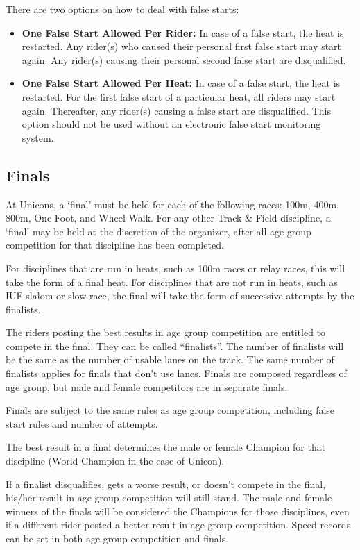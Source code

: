 There are two options on how to deal with false starts:
\begin{itemize}
\item \textbf{One False Start Allowed Per Rider:}
In case of a false start, the heat is restarted.
Any rider(s) who caused their personal first false start may start again.
Any rider(s) causing their personal second false start are disqualified.
\item \textbf{One False Start Allowed Per Heat:} 
In case of a false start, the heat is restarted.
For the first false start of a particular heat, all riders may start again.
Thereafter, any rider(s) causing a false start are disqualified.
This option should not be used without an electronic false start monitoring system.
\end{itemize}


\subsection{Finals}

At Unicons, a `final' must be held for each of the following races: 100m, 400m, 800m, One Foot, and Wheel Walk. 
For any other Track \& Field discipline, a `final' may be held at the discretion of the organizer, after all age group competition for that discipline has been completed.

For disciplines that are run in heats, such as 100m races or relay races, this will take the form of a final heat. 
For disciplines that are not run in heats, such as IUF slalom or slow race, the final will take the form of successive attempts by the finalists.

The riders posting the best results in age group competition are entitled to compete in the final.
They can be called ``finalists''.
The number of finalists will be the same as the number of usable lanes on the track.
The same number of finalists applies for finals that don’t use lanes. 
Finals are composed regardless of age group, but male and female competitors are in separate finals.

Finals are subject to the same rules as age group competition, including false start rules and number of attempts.

The best result in a final determines the male or female Champion for that discipline (World Champion in the case of Unicon).

If a finalist disqualifies, gets a worse result, or doesn’t compete in the final, his/her result in age group competition will still stand.
The male and female winners of the finals will be considered the Champions for those disciplines, even if a different rider posted a better result in age group competition.
Speed records can be set in both age group competition and finals.

